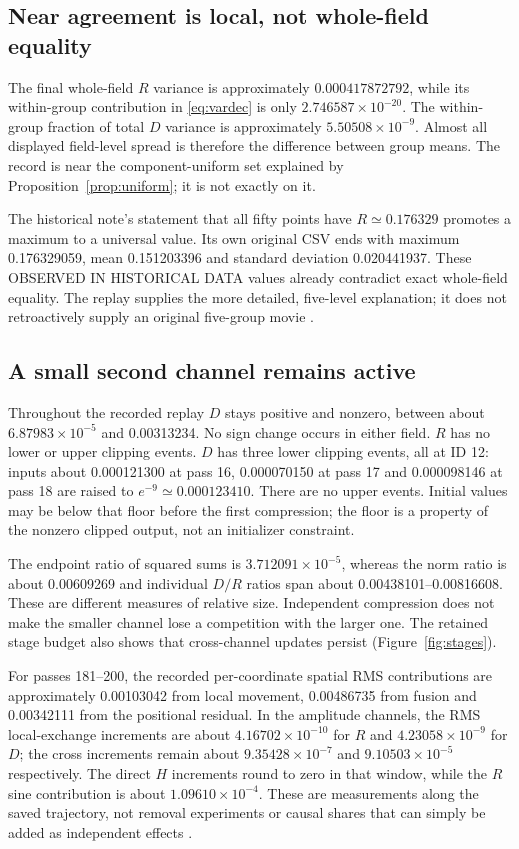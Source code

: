 \documentclass[11pt,a4paper]{article}
\newcommand{\ev}[1]{\textsf{\small #1}}
\begin{document}
\subsection{Near agreement is local, not whole-field equality}
The final whole-field $R$ variance is approximately $0.000417872792$, while its within-group contribution in \eqref{eq:vardec} is only $2.746587\times10^{-20}$. The within-group fraction of total $D$ variance is approximately $5.50508\times10^{-9}$. Almost all displayed field-level spread is therefore the difference between group means. The record is near the component-uniform set explained by Proposition~\ref{prop:uniform}; it is not exactly on it.

The historical note's statement that all fifty points have $R\simeq0.176329$ promotes a maximum to a universal value. Its own original CSV ends with maximum 0.176329059, mean 0.151203396 and standard deviation 0.020441937. These \ev{OBSERVED IN HISTORICAL DATA} values already contradict exact whole-field equality. The replay supplies the more detailed, five-level explanation; it does not retroactively supply an original five-group movie \cite{evidence5,review5}.

\subsection{A small second channel remains active}
Throughout the recorded replay $D$ stays positive and nonzero, between about $6.87983\times10^{-5}$ and 0.00313234. No sign change occurs in either field. $R$ has no lower or upper clipping events. $D$ has three lower clipping events, all at ID 12: inputs about 0.000121300 at pass 16, 0.000070150 at pass 17 and 0.000098146 at pass 18 are raised to $e^{-9}\simeq0.000123410$. There are no upper events. Initial values may be below that floor before the first compression; the floor is a property of the nonzero clipped output, not an initializer constraint.

The endpoint ratio of squared sums is $3.712091\times10^{-5}$, whereas the norm ratio is about 0.00609269 and individual $D/R$ ratios span about 0.00438101--0.00816608. These are different measures of relative size. Independent compression does not make the smaller channel lose a competition with the larger one. The retained stage budget also shows that cross-channel updates persist (Figure~\ref{fig:stages}).

For passes 181--200, the recorded per-coordinate spatial RMS contributions are approximately 0.00103042 from local movement, 0.00486735 from fusion and 0.00342111 from the positional residual. In the amplitude channels, the RMS local-exchange increments are about $4.16702\times10^{-10}$ for $R$ and $4.23058\times10^{-9}$ for $D$; the cross increments remain about $9.35428\times10^{-7}$ and $9.10503\times10^{-5}$ respectively. The direct $H$ increments round to zero in that window, while the $R$ sine contribution is about $1.09610\times10^{-4}$. These are measurements along the saved trajectory, not removal experiments or causal shares that can simply be added as independent effects \cite{analysis5}.
\end{document}
